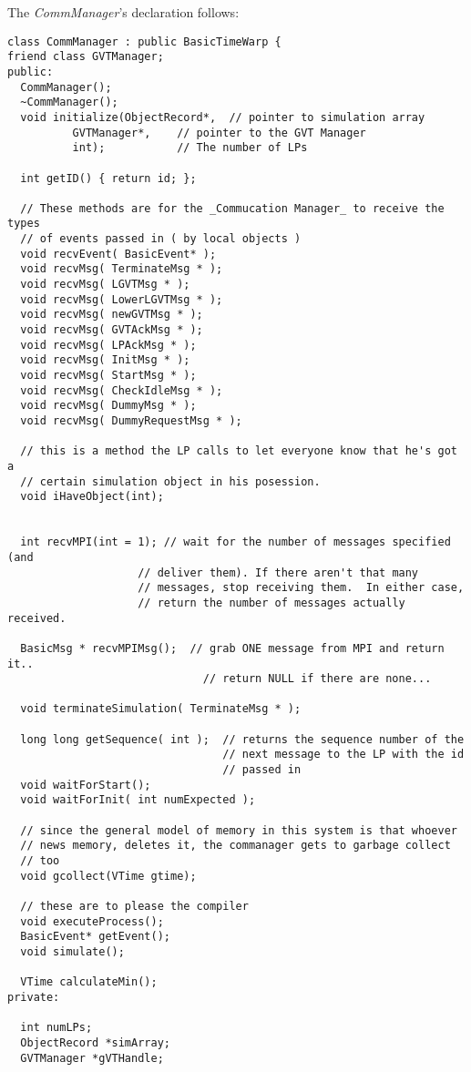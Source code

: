 \documentclass[11pt]{report}
\begin{document}
The {\it CommManager}'s declaration follows:

\begin{verbatim}
class CommManager : public BasicTimeWarp {
friend class GVTManager;
public:
  CommManager();
  ~CommManager();
  void initialize(ObjectRecord*,  // pointer to simulation array
		  GVTManager*,    // pointer to the GVT Manager
		  int);           // The number of LPs

  int getID() { return id; };

  // These methods are for the _Commucation Manager_ to receive the types
  // of events passed in ( by local objects )
  void recvEvent( BasicEvent* );
  void recvMsg( TerminateMsg * );
  void recvMsg( LGVTMsg * );
  void recvMsg( LowerLGVTMsg * );
  void recvMsg( newGVTMsg * );
  void recvMsg( GVTAckMsg * );
  void recvMsg( LPAckMsg * );
  void recvMsg( InitMsg * );
  void recvMsg( StartMsg * );
  void recvMsg( CheckIdleMsg * );
  void recvMsg( DummyMsg * );
  void recvMsg( DummyRequestMsg * );

  // this is a method the LP calls to let everyone know that he's got a
  // certain simulation object in his posession.
  void iHaveObject(int);


  int recvMPI(int = 1); // wait for the number of messages specified (and
                    // deliver them). If there aren't that many 
                    // messages, stop receiving them.  In either case,
                    // return the number of messages actually received.

  BasicMsg * recvMPIMsg();  // grab ONE message from MPI and return it..
                              // return NULL if there are none...

  void terminateSimulation( TerminateMsg * );

  long long getSequence( int );  // returns the sequence number of the
                                 // next message to the LP with the id
                                 // passed in
  void waitForStart();
  void waitForInit( int numExpected );

  // since the general model of memory in this system is that whoever
  // news memory, deletes it, the commanager gets to garbage collect
  // too
  void gcollect(VTime gtime);

  // these are to please the compiler
  void executeProcess();
  BasicEvent* getEvent();
  void simulate();
  
  VTime calculateMin();
private:

  int numLPs;
  ObjectRecord *simArray;
  GVTManager *gVTHandle;


\end{verbatim}
\end{document}
